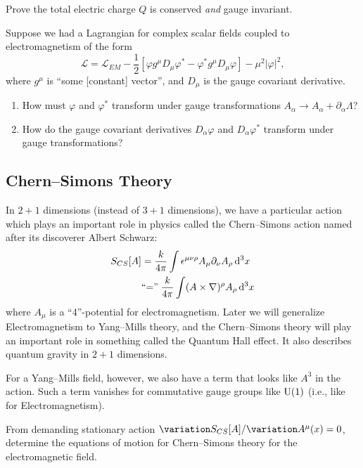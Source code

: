 \begin{exercise}
Prove the total electric charge $Q$ is conserved \emph{and} gauge invariant.
\end{exercise}

\begin{exercise}
Suppose we had a Lagrangian for complex scalar fields coupled to
electromagnetism of the form
\begin{equation}
\mathcal{L}=\mathcal{L}_{EM}-\frac{1}{2}[\varphi g^{\mu}D_{\mu}\varphi^{*}-\varphi^{*}g^{\mu}D_{\mu}\varphi]-\mu^{2}|\varphi|^{2},
\end{equation}
where $g^{\mu}$ is ``some [constant] vector'', and $D_{\mu}$ is the
gauge covariant derivative.
\begin{enumerate}
\item How must $\varphi$ and $\varphi^{*}$ transform under gauge
  transformations $A_{\alpha}\to A_{\alpha}+\partial_{\alpha}\Lambda$?
\item How do the gauge covariant derivatives $D_{\alpha}\varphi$ and
  $D_{\alpha}\varphi^{*}$ transform under gauge transformations?
\end{enumerate}
\end{exercise}

\subsection{Chern--Simons Theory}

\M
In $2+1$ dimensions (instead of $3+1$ dimensions), we have a particular
action which plays an important role in physics called the Chern--Simons
action named after its discoverer Albert Schwarz:
\begin{equation}
\begin{split}
  S_{CS}[A] &= \frac{k}{4\pi}\int\epsilon^{\mu\nu\rho}A_{\mu}\partial_{\nu}A_{\rho}\,\mathrm{d}^{3}x\\
&\mbox{``=''}\; \frac{k}{4\pi}\int(A\times\nabla)^{\rho} A_{\rho}\,\mathrm{d}^{3}x
\end{split}
\end{equation}
where $A_{\mu}$ is a ``4''-potential for electromagnetism. Later we will
generalize Electromagnetism to Yang--Mills theory, and the Chern--Simons
theory will play an important role in something called the Quantum Hall
effect. It also describes quantum gravity in $2+1$ dimensions.

For a Yang--Mills field, however, we also have a term that looks like
$A^{3}$ in the action. Such a term vanishes for commutative gauge groups
like $\operatorname{U}(1)$ (i.e., like for Electromagnetism).

\begin{exercise}
From demanding stationary action $\variation\action_{CS}[A]/\variation A^{\mu}(x)=0$,
determine the equations of motion for Chern--Simons theory for the
electromagnetic field.
\end{exercise}